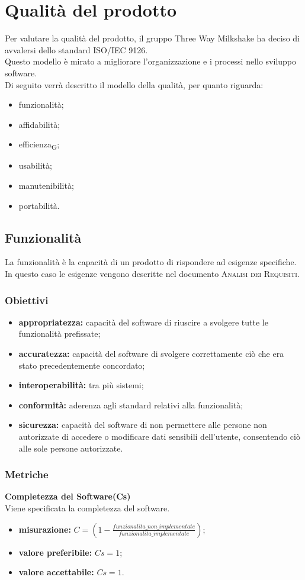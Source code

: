 \section{Qualità del prodotto}
Per valutare  la qualità del prodotto, il gruppo Three Way Milkshake ha deciso di avvalersi dello standard ISO/IEC 9126.\\
Questo modello è mirato a  migliorare l'organizzazione e i processi nello sviluppo software.\\
Di seguito verrà descritto il modello della qualità, per quanto riguarda:
\begin{itemize}
	\item funzionalità;
	\item affidabilità;
	\item efficienza\textsubscript{G};
	\item usabilità;
	\item manutenibilità;
	\item portabilità.
\end{itemize}

\subsection{Funzionalità}
La funzionalità è la capacità di un prodotto di rispondere ad esigenze specifiche.\\
In questo caso le esigenze vengono descritte nel documento \textsc{Analisi dei Requisiti}.
\subsubsection{Obiettivi}
\begin{itemize}
	\item \textbf{appropriatezza:} capacità del software di riuscire a svolgere tutte le funzionalità prefissate;
	\item \textbf{accuratezza:} capacità del software di svolgere correttamente ciò che era stato precedentemente concordato;
	\item \textbf{interoperabilità:} tra più sistemi;
	\item \textbf{conformità:} aderenza agli standard relativi alla funzionalità;
	\item \textbf{sicurezza:} capacità del software di non permettere alle persone non autorizzate di accedere o modificare dati sensibili dell'utente, consentendo ciò alle sole persone autorizzate.
\end{itemize}

\subsubsection{Metriche}
\textbf{Completezza del Software(Cs)}\\
Viene specificata la completezza del software.
\begin{itemize}
	\item \textbf{misurazione:} $C = (1- \frac{funzionalita\_non\_implementate }{funzionalita\_implementate})$;
	\item \textbf{valore preferibile:} $Cs = 1$;
	\item \textbf{valore accettabile:} $Cs = 1$.
\end{itemize}
\pagebreak
